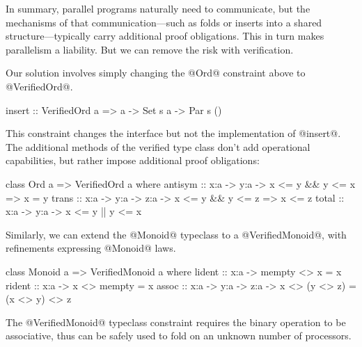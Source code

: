 In summary, parallel programs naturally need to communicate, but the mechanisms
of that communication---such as folds or inserts into a shared
structure---typically carry additional proof obligations.  This in turn makes
parallelism a liability.  But we can remove the risk with verification.




%
Our solution involves simply changing the @Ord@ constraint above to
@VerifiedOrd@.
\begin{mcode}
 insert :: VerifiedOrd a => a -> Set s a -> Par s ()
\end{mcode}
%
This constraint changes the interface but not the implementation of @insert@.
%
%
The additional methods of the verified type class don't add operational
capabilities, but rather impose additional proof obligations:

\begin{code}
class Ord a => VerifiedOrd a where
 antisym :: x:a -> y:a
         -> { x <= y && y <= x => x = y }
 trans   :: x:a -> y:a -> z:a
         -> { x <= y && y <= z => x <= z }
 total   :: x:a -> y:a -> { x <= y || y <= x }
\end{code}


Similarly, we can extend
the @Monoid@ typeclass to a @VerifiedMonoid@, with refinements
expressing @Monoid@ laws.
%
\begin{code}
class Monoid a => VerifiedMonoid a where
 lident :: x:a -> { mempty <> x = x }
 rident :: x:a -> { x <> mempty = x }
 assoc  :: x:a -> y:a -> z:a
        -> { x <> (y <> z) = (x <> y) <> z }
\end{code}
The @VerifiedMonoid@ typeclass constraint requires the binary operation
to be associative, thus can be safely used to fold on
an unknown number of processors.


